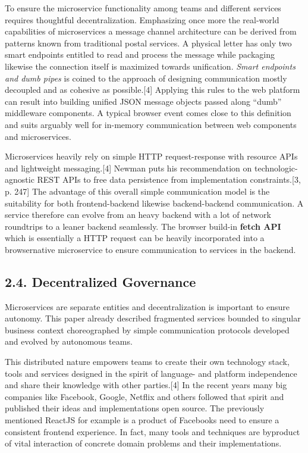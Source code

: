 \documentclass[]{article}
\begin{document}
To ensure the microservice functionality among teams and different
services requires thoughtful decentralization. Emphasizing once more the
real-world capabilities of microservices a message channel architecture
can be derived from patterns known from traditional postal services. A
physical letter has only two smart endpoints entitled to read and
process the message while packaging likewise the connection itself is
maximized towards unification. \emph{Smart endpoints and dumb pipes} is
coined to the approach of designing communication mostly decoupled and
as cohesive as possible.{[}4{]} Applying this rules to the web platform
can result into building unified JSON message objects passed along
``dumb'' middleware components. A typical browser event comes close to
this definition and suits arguably well for in-memory communication
between web components and microservices.

Microservices heavily rely on simple HTTP request-response with resource
APIs and lightweight messaging.{[}4{]} Newman puts his recommendation on
technologic-agnostic REST APIs to free data persistence from
implementation constraints.{[}3, p. 247{]} The advantage of this overall
simple communication model is the suitability for both frontend-backend
likewise backend-backend communication. A service therefore can evolve
from an heavy backend with a lot of network roundtrips to a leaner
backend seamlessly. The browser build-in \textbf{fetch API} which is
essentially a HTTP request can be heavily incorporated into a
browsernative microservice to ensure communication to services in the
backend.

\subsection{2.4. Decentralized
Governance}\label{decentralized-governance}

Microservices are separate entities and decentralization is important to
ensure autonomy. This paper already described fragmented services
bounded to singular business context choreographed by simple
communication protocols developed and evolved by autonomous teams.

This distributed nature empowers teams to create their own technology
stack, tools and services designed in the spirit of language- and
platform independence and share their knowledge with other
parties.{[}4{]} In the recent years many big companies like Facebook,
Google, Netflix and others followed that spirit and published their
ideas and implementations open source. The previously mentioned ReactJS
for example is a product of Facebooks need to ensure a consistent
frontend experience. In fact, many tools and techniques are byproduct of
vital interaction of concrete domain problems and their implementations.
\end{document}
